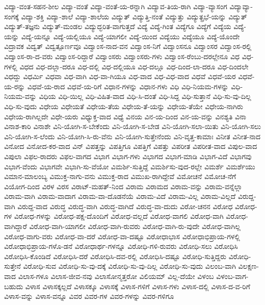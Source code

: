 {ವಿದ್ಯಾ-ವಂತ-ಸಹನ-ಶೀಲ
ವಿದ್ಯಾ-ವಂತೆ
ವಿದ್ಯಾ-ವಂತೆ-ಯ-ರನ್ನಾಗಿ
ವಿದ್ಯಾವ-ತಿಯ-ರಾಗಿ
ವಿದ್ಯಾ-ವ್ಯಾಸಂಗ
ವಿದ್ಯಾವ್ಯಾ-ಸಂಗಕ್ಕೆ
ವಿದ್ಯಾ-ಶಕ್ತಿ
ವಿದ್ಯಾ-ಶಾಲೆ
ವಿದ್ಯಾ-ಶಾಲೆಯ
ವಿದ್ಯುತ್
ವಿದ್ಯುತ್ತಿ-ನಂತೆ
ವಿದ್ಯುತ್ತು
ವಿದ್ಯುತ್ಪ್ರಭೆ-ಯನ್ನು
ವಿದ್ಯುತ್
ವಿದ್ಯುತ್-ತಜ್ಞನು
ವಿದ್ಯುತ್-ಮಂಡಲ
ವಿದ್ಯುದ್ಭರಿತ-ವಾಗುತ್ತದೆ
ವಿದ್ಯೆ
ವಿದ್ಯೆ-ಗಿಂತ
ವಿದ್ಯೆಗೂ
ವಿದ್ಯೆಗೆ
ವಿದ್ಯೆಯ
ವಿದ್ಯೆ-ಯನ್ನು
ವಿದ್ಯೆ-ಯನ್ನೂ
ವಿದ್ಯೆ-ಯಲ್ಲಿಯೂ
ವಿದ್ಯೆ-ಯಾಗಲೀ
ವಿದ್ಯೆ-ಯಿಂದ
ವಿದ್ಯೆಯು
ವಿದ್ಯೆಯೂ
ವಿದ್ಯೆ-ಯೊಂದೇ
ವಿದ್ರಾವಕ
ವಿದ್ವತ್
ವಿದ್ವತ್ಪೂರ್ಣವೂ
ವಿದ್ವಾಂಸ-ನಾದ-ವನ
ವಿದ್ವಾಂಸ-ನಿಗೆ
ವಿದ್ವಾಂಸನೂ
ವಿದ್ವಾಂಸರ
ವಿದ್ವಾಂಸ-ರಲ್ಲಿ
ವಿದ್ವಾಂಸ-ರಾ-ದ-ವರು
ವಿದ್ವಾಂಸ-ರಿದ್ದಾರೆ
ವಿದ್ವಾಂಸರು
ವಿದ್ವಾಂಸರು-ಗಳು
ವಿದ್ವಾಂಸ-ರೆಂಬು-ದರಲ್ಲೇನೂ
ವಿಧ
ವಿಧ-ಗಳಲ್ಲಿ
ವಿಧದ
ವಿಧ-ದಲ್ಲಾ-ದರೂ
ವಿಧ-ದಲ್ಲಿ
ವಿಧ-ದಲ್ಲಿಯೂ
ವಿಧ-ದಲ್ಲೂ
ವಿಧ-ದಿಂದ-ಲಾ-ದರೂ
ವಿಧ-ದಿಂದಲೇ
ವಿಧದ್ದು
ವಿಧರ್ಮಿ
ವಿಧವಾ
ವಿಧ-ವಾಗಿ
ವಿಧ-ವಾ-ಗಿಯೂ
ವಿಧ-ವಾದ
ವಿಧ-ವಿಧ-ವಾದ
ವಿಧವೆ
ವಿಧವೆ-ಯರ
ವಿಧವೆ-ಯ-ರನ್ನು
ವಿಧವೆ-ಯ-ರಾದ
ವಿಧವೆ-ಯ-ರಿಗೆ
ವಿಧಾನ-ಗಳನ್ನು
ವಿಧಾನ-ಗಳು
ವಿಧಿ
ವಿಧಿ-ನಿಯಮ-ಗಳನ್ನು
ವಿಧಿ-ನಿಯಮ-ವನ್ನು
ವಿಧಿಯ
ವಿಧಿ-ಯಿಲ್ಲ
ವಿಧಿ-ವಿಹಿತ-ವಾದ
ವಿಧಿ-ಸಿ-ದಂತೆ
ವಿಧಿ-ಸಿದ್ದ
ವಿಧಿ-ಸುತ್ತಾನೆ
ವಿಧಿ-ಸು-ವು-ದಿಲ್ಲ
ವಿಧಿ-ಸು-ವುದು
ವಿಧೇಯ
ವಿಧೇಯತೆ
ವಿಧೇಯ-ತೆಯ
ವಿಧೇಯ-ತೆ-ಯನ್ನು
ವಿಧೇಯ-ತೆಯೇ
ವಿಧೇಯ-ನಾಗಿರು
ವಿಧೇಯ-ರಾಗಿಲ್ಲದೇ
ವಿಧೇ-ಯರು
ವಿಧ್ಯುಕ್ತ-ವಾದ
ವಿಧ್ಯೆ
ವಿನಯ
ವಿನ-ಯ-ದಿಂದ
ವಿನ-ಯ-ವನ್ನು
ವಿನಶ್ಯತಿ
ವಿನಾ
ವಿನಾಶ-ಕಾರಿ
ವಿನಾಶೇ
ವಿನಿ-ಯೋಗಿ-ಸ-ಬೇಕೆಂದು
ವಿನಿ-ಯೋಗಿ-ಸ-ಬೇಡ
ವಿನಿ-ಯೋಗಿ-ಸಲಾ-ಯಿತು
ವಿನಿ-ಯೋಗಿ-ಸಲು
ವಿನಿ-ಯೋಗಿ-ಸ-ಲೆಂದು
ವಿನಿ-ಯೋಗಿ-ಸಿ-ರು-ವೆನು
ವಿನಿ-ಯೋಗಿ-ಸುತ್ತೇನೆಂದು
ವಿನಿ-ವೃತ್ತ-ಕಾಮಾಃ
ವಿನೀತ
ವಿನೀತ-ನಾದ
ವಿನೋದ
ವಿನೋದ-ಕರ-ವಾದ
ವಿನ್
ವಿಪತ್ತನ್ನು
ವಿಪತ್ತಿಗೂ
ವಿಪತ್ತಿಗೆ
ವಿಪತ್ತು
ವಿಪರೀತ
ವಿಪರೀತ-ವಾದ
ವಿಪುಲ-ವಾದ
ವಿಪುಲಾ
ವಿಫಲ-ರಾದರು
ವಿಫಲ-ವಾಗದ
ವಿಭಾಗ
ವಿಭಾಗ-ಗಳು
ವಿಭಾಗದ
ವಿಭಾಗ-ಮಾಡಿ
ವಿಭಾಗ-ವಿದೆ
ವಿಭಾಗವು
ವಿಭಾಗ-ವೆಂದು
ವಿಭಾಗವೇ
ವಿಭಾಗಿ-ಸು-ವೆಯೋ
ವಿಮರ್ಶಿ-ಸುತ್ತಿದ್ದೆ
ವಿಮರ್ಶಿಸು-ವುದ-ರಲ್ಲೇ
ವಿಮರ್ಶೆ
ವಿಮರ್ಶೆಯು
ವಿಮಾನ-ಮಾಲಂಬ್ಯ
ವಿಮುಕ್ತ-ನಾಗು-ವನು
ವಿಮುಕ್ತ-ರಾದ
ವಿಮುಖ-ರಾಗಿದ್ದೇವೆ
ವಿಮೋಚನೆ
ವಿಮೋಚ-ನೆಗೆ
ವಿಯೋಗ-ದಿಂದ
ವಿರಳ
ವಿರಸ
ವಿರಾಟ್-ಮಹತ್-ನಿಂದ
ವಿರಾಮ
ವಿರಾಮದ
ವಿರಾಮ-ವನ್ನು
ವಿರಾಮ-ವನ್ನೆಲ್ಲಾ
ವಿರಾಮ-ವಾಗಿ
ವಿರಾಮ-ವಾದಾಗ
ವಿರಾಮ-ವಾ-ದೊಡನೆಯೆ
ವಿರಾಮ-ವಿದೆ
ವಿರಾಮ-ವಿಲ್ಲ
ವಿರಾಮ-ವಿಲ್ಲದೆ
ವಿರುದ್ದ-ವಾಗಿ
ವಿರುದ್ದ-ವಾದ
ವಿರುದ್ಧ
ವಿರುದ್ಧ-ವಾಗಿ
ವಿರುದ್ಧ-ವಾಗಿದೆ
ವಿರುದ್ಧ-ವಾ-ದುದು
ವಿರೋ-ಚನನ
ವಿರೋಧ
ವಿರೋಧ-ಗಳ
ವಿರೋಧ-ಗಳನ್ನು
ವಿರೋಧ-ಪಕ್ಷ-ದೊಂದಿಗೆ
ವಿರೋಧ-ವಲ್ಲದೆ
ವಿರೋಧ-ವಾಗಲಿ
ವಿರೋಧ-ವಾಗಿ
ವಿರೋಧ-ವಾಗಿದ್ದಾರೆ
ವಿರೋಧ-ವಾಗಿ-ಯಾಗಲೀ
ವಿರೋಧ-ವಾಗಿ-ರುವರು
ವಿರೋಧ-ವಾಗಿ-ರು-ವುದೇ
ವಿರೋಧ-ವಾಗಿಲ್ಲ
ವಿರೋಧ-ವಾಗು-ವರು
ವಿರೋಧ-ವಾ-ದರೆ
ವಿರೋಧ-ವಾ-ದಷ್ಟೂ
ವಿರೋಧಾಭಾಸ
ವಿರೋಧಾಭಿಪ್ರಾಯ-ಗಳಲ್ಲಿ
ವಿರೋಧಾಭಿಪ್ರಾಯ-ಗಳೊ-ಡನೆ
ವಿರೋಧಾರ್ಥ-ಗಳನ್ನೂ
ವಿರೋಧಿ-ಗಳಿ-ರುವರು
ವಿರೋಧಿ-ಸಲು
ವಿರೋಧಿಸಿ
ವಿರೋಧಿಸಿ-ಕೊಂಡಿದೆ
ವಿರೋಧಿಸಿ-ದರೆ
ವಿರೋಧಿಸಿ-ದವ-ರಲ್ಲಿ
ವಿರೋಧಿಸಿ-ದಷ್ಟೂ
ವಿರೋಧಿ-ಸುತ್ತಿದ್ದರು
ವಿರೋಧಿ-ಸುತ್ತೇನೆ
ವಿರೋಧಿ-ಸುವ
ವಿರೋಧಿ-ಸು-ವು-ದಕ್ಕೆ
ವಿರೋಧಿ-ಸು-ವು-ದಿಲ್ಲ
ವಿರೋಧಿ-ಸು-ವುದು
ವಿಲಂಬ-ವಾಗಿ
ವಿಲಕ್ಷಣ-ವಾದ
ವಿಲಾಸ-ಗಳೂ
ವಿಲಾಸ-ಜೀವ-ನವು
ವಿಲಾಸೋನ್ಮತ್ತರೋ
ವಿಲಿಯಮ್
ವಿಲ್ಲ-ದೆಯೇ
ವಿಳಂಬ
ವಿಳಂಬ-ವಾಗ-ಬಹುದು
ವಿಳಾಸ
ವಿಳಾಸಕ್ಕಲ್ಲದೆ
ವಿಳಾಸಕ್ಕೂ
ವಿಳಾಸಕ್ಕೆ
ವಿಳಾಸ-ಗಳಿಗೆ
ವಿಳಾಸ-ಗಳು
ವಿಳಾಸ-ದಲ್ಲಿ
ವಿಳಾಸ-ದ-ವ-ರಿಗೆ
ವಿಳಾಸ-ವನ್ನು
ವಿಳಾಸ-ವನ್ನೂ
ವಿವರ
ವಿವರ-ಗಳ
ವಿವರ-ಗಳನ್ನು
ವಿವರ-ಗಳಿಗೂ
}
